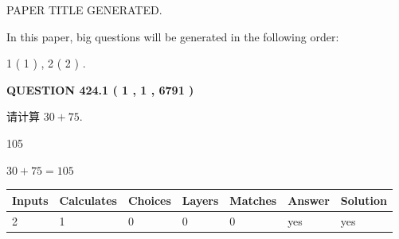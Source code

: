 \documentclass{ctexart}
\begin{document}
   
 \vspace{0.2in}
 
 
 
 
   
   
 PAPER TITLE GENERATED.
   
   
   
\vspace{0.2in}
   
In this paper, big questions will be generated in the following order: 
   
   
   1 ( 1 )
 ,
   2 ( 2 )
 .
  
\vspace{0.2in}
  
{\textbf{\Large{QUESTION
424.1 
 ( 1 , 1 , 6791 )
}}}
  
  
 
请计算 $ %
30 +  %
75 $.
 
 
 
\noindent{}
 
 

105
 
 
\noindent{}
 
 

 
 
 
\noindent{}
 
 

$ %
30 +  %
75=   %
105$
 
 
\noindent{}
 
 

 
   
   
   
   
\noindent\begin{tabular}{|l|l|l|l|l|l|l|}
 \hline
Inputs & Calculates & Choices & Layers & Matches & Answer & Solution \\ \hline
 2  & 
 1  & 
 0
  & 
 0  & 
 0  & 
  yes & 
  yes 
  \\ \hline
 \end{tabular}
   
   
   
   
\noindent{}
   
   
  
\end{document}
